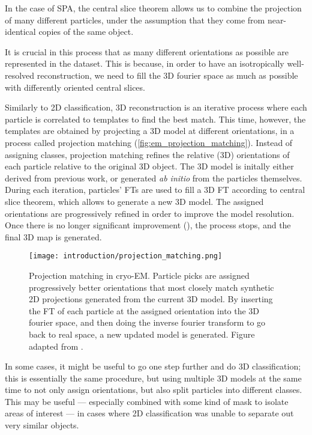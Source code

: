 In the case of SPA, the central slice theorem allows us to combine the projection of many different particles, under the assumption that they come from near-identical copies of the same object.

It is crucial in this process that as many different orientations as possible are represented in the dataset.
This is because, in order to have an isotropically well-resolved reconstruction, we need to fill the 3D fourier space as much as possible with differently oriented central slices.

Similarly to 2D classification, 3D reconstruction is an iterative process where each particle is correlated to templates to find the best match.
This time, however, the templates are obtained by projecting a 3D model at different orientations, in a process called projection matching (\autoref{fig:em_projection_matching}).
Instead of assigning classes, projection matching refines the relative (3D) orientations of each particle relative to the original 3D object.
The 3D model is initally either derived from previous work, or generated \textit{ab initio} from the particles themselves.
During each iteration, particles' FTs are used to fill a 3D FT according to central slice theorem, which allows to generate a new 3D model.
The assigned orientations are progressively refined in order to improve the model resolution.
Once there is no longer significant improvement (), the process stops, and the final 3D map is generated.

\begin{figure}[ht]
    \centering
    \texttt{[image: introduction/projection\_matching.png]}
    \caption[Projection matching]{Projection matching in cryo-EM. Particle picks are assigned progressively better orientations that most closely match synthetic 2D projections generated from the current 3D model. By inserting the FT of each particle at the assigned orientation into the 3D fourier space, and then doing the inverse fourier transform to go back to real space, a new updated model is generated. Figure adapted from \citet{nogalesCryoEMUniqueTool2015}.}
    \label{fig:em_projection_matching}
\end{figure}

In some cases, it might be useful to go one step further and do 3D classification; this is essentially the same procedure, but using multiple 3D models at the same time to not only assign orientations, but also split particles into different classes.
This may be useful --- especially combined with some kind of mask to isolate areas of interest --- in cases where 2D classification was unable to separate out very similar objects.

